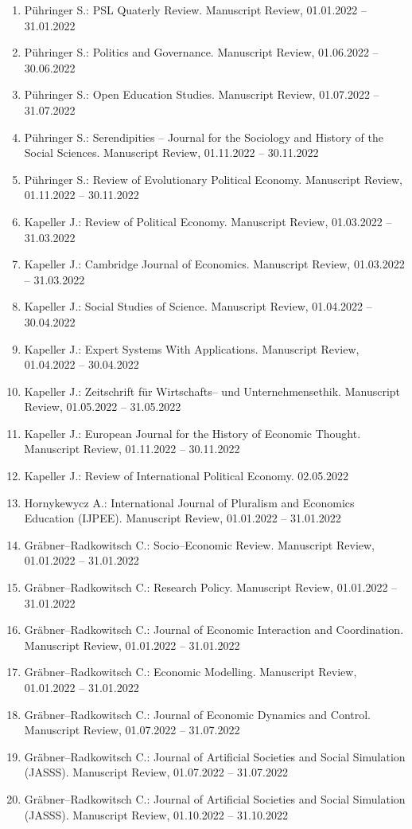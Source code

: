 \begin{enumerate}[leftmargin=*, labelsep=0.5cm]
\item Pühringer S.: PSL Quaterly Review. Manuscript Review, 01.01.2022 -- 31.01.2022
\item Pühringer S.: Politics and Governance. Manuscript Review, 01.06.2022 -- 30.06.2022
\item Pühringer S.: Open Education Studies. Manuscript Review, 01.07.2022 -- 31.07.2022
\item Pühringer S.: Serendipities -- Journal for the Sociology and History of the Social Sciences. Manuscript Review, 01.11.2022 -- 30.11.2022
\item Pühringer S.: Review of Evolutionary Political Economy. Manuscript Review, 01.11.2022 -- 30.11.2022
\item Kapeller J.: Review of Political Economy. Manuscript Review, 01.03.2022 -- 31.03.2022
\item Kapeller J.: Cambridge Journal of Economics. Manuscript Review, 01.03.2022 -- 31.03.2022
\item Kapeller J.: Social Studies of Science. Manuscript Review, 01.04.2022 -- 30.04.2022
\item Kapeller J.: Expert Systems With Applications. Manuscript Review, 01.04.2022 -- 30.04.2022
\item Kapeller J.: Zeitschrift für Wirtschafts-- und Unternehmensethik. Manuscript Review, 01.05.2022 -- 31.05.2022
\item Kapeller J.: European Journal for the History of Economic Thought. Manuscript Review, 01.11.2022 -- 30.11.2022
\item Kapeller J.: Review of International Political Economy. 02.05.2022
\item Hornykewycz A.: International Journal of Pluralism and Economics Education (IJPEE). Manuscript Review, 01.01.2022 -- 31.01.2022
\item Gräbner--Radkowitsch C.: Socio--Economic Review. Manuscript Review, 01.01.2022 -- 31.01.2022
\item Gräbner--Radkowitsch C.: Research Policy. Manuscript Review, 01.01.2022 -- 31.01.2022
\item Gräbner--Radkowitsch C.: Journal of Economic Interaction and Coordination. Manuscript Review, 01.01.2022 -- 31.01.2022
\item Gräbner--Radkowitsch C.: Economic Modelling. Manuscript Review, 01.01.2022 -- 31.01.2022
\item Gräbner--Radkowitsch C.: Journal of Economic Dynamics and Control. Manuscript Review, 01.07.2022 -- 31.07.2022
\item Gräbner--Radkowitsch C.: Journal of Artificial Societies and Social Simulation (JASSS). Manuscript Review, 01.07.2022 -- 31.07.2022
\item Gräbner--Radkowitsch C.: Journal of Artificial Societies and Social Simulation (JASSS). Manuscript Review, 01.10.2022 -- 31.10.2022
\end{enumerate}
